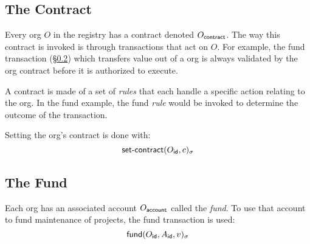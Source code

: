 \subsection{The Contract}
Every org $O$ in the registry has a contract denoted $O_{\mathsf{contract}}$.
The way this contract is invoked is through transactions that act on $O$. For
example, the \textsf{fund} transaction (\S\ref{s:fund}) which transfers value
out of a org is always validated by the org contract before it
is authorized to execute.

A contract is made of a set of \emph{rules} that each handle a specific action
relating to the org. In the \textsf{fund} example, the \textsf{fund}
\emph{rule} would be invoked to determine the outcome of the transaction.

Setting the org's contract is done with:
\[
    \operatorname{\mathsf{set-contract}}\lparen O_{\mathsf{id}}, c\rparen_\sigma
\]


\subsection{The Fund}
\label{s:fund}
Each org has an associated account $O_{\mathsf{account}}$ called the
\emph{fund}. To use that account to fund maintenance of projects,
the \textsf{fund} transaction is used:
\[
    \operatorname{\mathsf{fund}}\lparen O_{\mathsf{id}}, A_{\mathsf{id}}, v\rparen_\sigma
\]

